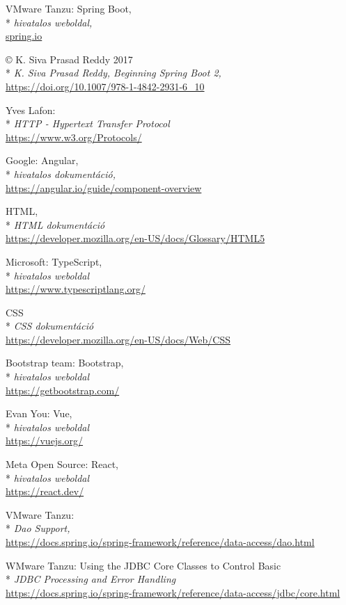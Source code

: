 \begin{thebibliography}{x}
 VMware Tanzu: Spring Boot,\\*
\textit{hivatalos weboldal,}
\\ \url{spring.io}

 © K. Siva Prasad Reddy 2017\\*
\textit{K. Siva Prasad Reddy, Beginning Spring Boot 2,}
\\ \url{https://doi.org/10.1007/978-1-4842-2931-6_10}

 Yves Lafon:\\*
\textit{HTTP - Hypertext Transfer Protocol}
\\ \url{https://www.w3.org/Protocols/}

 Google: Angular,\\*
\textit{hivatalos dokumentáció,}
\\ \url{https://angular.io/guide/component-overview}

  HTML,\\*
\textit{HTML dokumentáció}
\\ \url{https://developer.mozilla.org/en-US/docs/Glossary/HTML5}

 Microsoft: TypeScript,\\*
\textit{hivatalos weboldal}
\\ \url{https://www.typescriptlang.org/}

 CSS\\*
\textit{CSS dokumentáció}
\\ \url{https://developer.mozilla.org/en-US/docs/Web/CSS}

 Bootstrap team: Bootstrap,\\*
\textit{hivatalos weboldal}
\\ \url{https://getbootstrap.com/}

 Evan You: Vue,\\*
\textit{hivatalos weboldal}
\\ \url{https://vuejs.org/}

 Meta Open Source: React,\\*
\textit{hivatalos weboldal}
\\ \url{https://react.dev/}

 VMware Tanzu:\\*
\textit{Dao Support,}
\\ \url{https://docs.spring.io/spring-framework/reference/data-access/dao.html}

 WMware Tanzu: Using the JDBC Core Classes to Control Basic\\*
\textit{JDBC Processing and Error Handling}
\\ \url{https://docs.spring.io/spring-framework/reference/data-access/jdbc/core.html}


\end{thebibliography}
